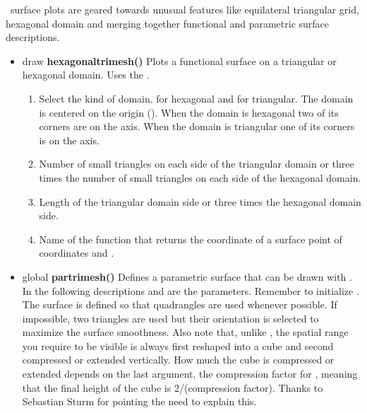 \FP\ surface plots are geared towards unusual features like
equilateral triangular grid, hexagonal domain and merging
together functional and parametric surface descriptions.
\begin{itemize}
\item draw {\bfseries hexagonaltrimesh()} Plots a
functional surface on a triangular or hexagonal
domain. Uses the .
\begin{enumerate}
\item {} Select the kind of
domain.  for hexagonal and
 for triangular. The domain is
centered on the origin (). When the
domain is hexagonal two of its corners are on the
 axis. When the
domain is triangular one of its corners is on the
 axis. 
\item {} Number of small triangles on
each side of the triangular domain or three times
the number of small triangles on
each side of the hexagonal domain.
\item {} Length of the triangular
domain side or three times the hexagonal domain
side.
\item {} Name of the function that
returns the  coordinate of a surface
point of coordinates  and .
\end{enumerate}
\item global {\bfseries partrimesh()} Defines a parametric
surface that can be drawn with
. In the following descriptions
 and  are the parameters. Remember
to initialize . The surface is defined so
that quadrangles are used whenever possible. If
impossible, two triangles are used but their
orientation is selected to maximize the surface
smoothness. Also note that, unlike
, the spatial range you
require to be visible is always first reshaped into a
cube and second compressed or extended vertically. How
much the cube is compressed or extended depends on the
last  argument, the compression factor
for , meaning that the final height of the
cube is 2/(compression factor). Thanks to Sebastian
Sturm for pointing the need to explain this.

\end{itemize}
